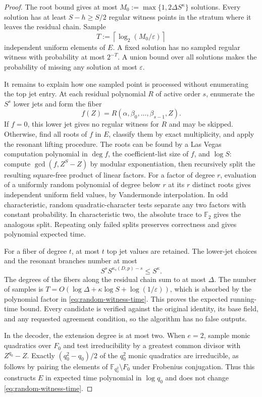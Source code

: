 \documentclass[11pt,letterpaper]{article}
\theoremstyle{definition}
\newcommand{\F}{\mathbb{F}}
\begin{document}
\begin{proof}
The root bound gives at most
\(M_0:=\max\{1,2\Delta S^\kappa\}\) solutions.  Every solution has at least
\(S-h\geq S/2\) regular witness points in the stratum where it leaves the
residual chain.  Sample
\[
  T:=\left\lceil\log_2(M_0/\varepsilon)\right\rceil
\]
independent uniform elements of \(E\).  A fixed solution has no sampled
regular witness with probability at most \(2^{-T}\).  A union bound over all
solutions makes the probability of missing any solution at most
\(\varepsilon\).

It remains to explain how one sampled point is processed without enumerating
the top jet entry.  At each residual polynomial \(R\) of active order
\(s\), enumerate the \(S^s\) lower jets and form the fiber
\[
  f(Z)=R(\alpha,\beta_0,\ldots,\beta_{s-1},Z).
\]
If \(f=0\), this lower jet gives no regular witness for \(R\) and may be
skipped.  Otherwise, find all roots of \(f\) in \(E\), classify them by
exact multiplicity, and apply the resonant lifting procedure. The roots can
be found by a Las Vegas computation polynomial in \(\deg f\), the
coefficient-list size of \(f\), and \(\log S\):
compute \(\gcd(f,Z^S-Z)\) by modular exponentiation, then recursively split
the resulting square-free product of linear factors.  For a factor of
degree \(r\), evaluation of a uniformly random polynomial of degree below
\(r\) at its \(r\) distinct roots gives independent uniform field values,
by Vandermonde interpolation.  In odd
characteristic, random quadratic-character tests separate any two factors
with constant probability.  In characteristic two, the absolute trace to
\(\F_2\) gives the analogous split.  Repeating only failed splits preserves
correctness and gives polynomial expected time.

For a fiber of degree \(t\), at most \(t\) top jet values are retained.  The
lower-jet choices and the resonant branches number at most
\[
  S^sS^{\kappa_s(D,p)-s}\leq S^\kappa.
\]
The degrees of the fibers along the residual chain sum to at most
\(\Delta\). The number of samples is
\(T=O(\log\Delta+\kappa\log S+\log(1/\varepsilon))\), which is absorbed by
the polynomial factor in \eqref{eq:random-witness-time}. This proves the
expected running-time bound. Every candidate is verified against the original
identity, its base field, and any requested agreement condition, so the
algorithm has no false outputs.

In the decoder, the extension degree is at most two.  When \(e=2\), sample
monic quadratics over \(F_0\) and test irreducibility by a greatest common
divisor with \(Z^{q_0}-Z\).  Exactly \((q_0^2-q_0)/2\) of the \(q_0^2\)
monic quadratics are irreducible, as follows by pairing the elements of
\(\F_{q_0^2}\setminus F_0\) under Frobenius conjugation.  Thus this
constructs \(E\) in expected time
polynomial in \(\log q_0\) and does not change
\eqref{eq:random-witness-time}.
\end{proof}
\end{document}
